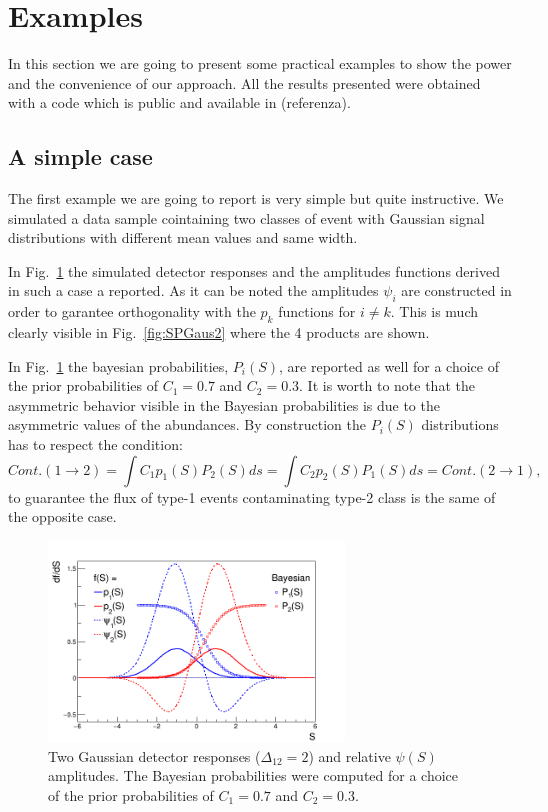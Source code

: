 \section{Examples}
In this section we are going to present some practical examples
to show the power and the convenience of our approach.
All the results presented were obtained with a code which is public and
available in (referenza).
\subsection{A simple case}
The first example we are going to report is very simple but quite instructive.
We simulated a data sample cointaining two classes of event with Gaussian
signal distributions with different mean values and same width.

In Fig.~\ref{fig:Gaus2} the simulated detector responses and the amplitudes
functions derived in such a case a reported. As it can be noted the amplitudes
$\psi_{i}$ are constructed in order to garantee orthogonality with the $p_{k}$
functions for $i \neq k$.
This is much clearly visible in Fig.~\ref{fig:SPGaus2} where the 4 products
are shown.

In Fig.~\ref{fig:Gaus2} the bayesian probabilities,
$P_{i}(S)$, are reported as well for a choice of the prior probabilities of
$C_{1}=0.7$ and $C_{2}=0.3$. It is worth to note that the asymmetric behavior
visible in the Bayesian probabilities is due to the asymmetric values of the
abundances. By construction the $P_{i}(S)$ distributions has to respect the
condition:
\begin{equation} 
\label{Sec3:BayesCond}
Cont. (1\rightarrow 2) = \int C_{1} p_{1}(S) P_{2}(S) ds = \int
C_{2} p_{2}(S) P_{1}(S) ds = Cont. (2\rightarrow 1),
\end{equation}
to guarantee the  flux of type-1 events contaminating
type-2 class is the same of the opposite case.

\begin{figure}[!htb]
\centering
\includegraphics[width=0.7\textwidth]{../png/figGaus2.png}
\caption{Two Gaussian detector responses ($\Delta_{12} = 2$) and relative
  $\psi(S)$ amplitudes. The Bayesian probabilities were computed for a choice
  of the prior probabilities of $C_{1}=0.7$ and $C_{2}=0.3$.}
\label{fig:Gaus2}
\end{figure}

